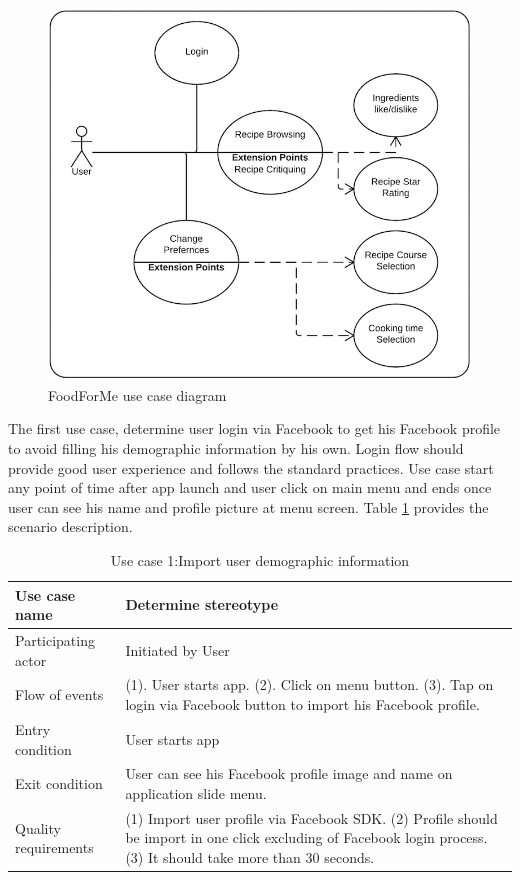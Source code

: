 \begin{figure}[h]
	\centering
	\includegraphics[width=.5\linewidth]{figures/ch4_use_case_foodforme.png}
	\caption{FoodForMe use case diagram}
	\label{fig:ch4_use_case_foodforme}
\end{figure}

\newpage
 
 The first use case, determine user login via Facebook to get his Facebook profile to avoid filling his demographic information by his own. Login flow should provide good user experience and follows the standard practices. Use case start any point of time after app launch and user click on main menu and ends once user can see his name and profile picture at menu screen.  Table \ref{table:import_user-demographic-information} provides the scenario description. \newline
 
 \begin{table}[ht]
 	\centering %
 	\begin{tabular}{p{4cm} p{10cm}}  %
 		\hline\hline %
 		Use case name & Determine stereotype \\ %
 		\hline %
 		
		Participating actor & Initiated by User \\ %
 		Flow of events & (1). User starts app.
 		(2). Click on menu button.
	 	(3). Tap on login via Facebook button to import his Facebook profile. \\
 		Entry condition & User starts app\\
 		Exit condition & User can see his Facebook profile image and name on application slide menu.\\
 		Quality requirements & (1) Import user profile via Facebook SDK. (2) Profile should be import in one click excluding of Facebook login process. (3) It should take more than 30 seconds.\\ [1ex] %
 		\hline %
 	\end{tabular}
 	\caption{Use case 1:Import user demographic information}
 	\label{table:import_user-demographic-information}
 \end{table}
 
